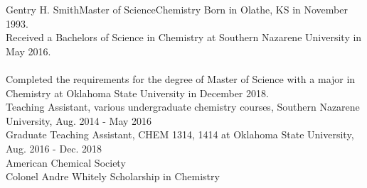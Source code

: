 \newpage
\begin{vita}{Gentry H. Smith}{Master of Science}{Chemistry} %
     Born in Olathe, KS in November 1993. 
     \\ Received a Bachelors of Science in Chemistry at Southern Nazarene University in May 2016. \\ \\
Completed the requirements for the degree of Master of Science with a major in Chemistry at Oklahoma State University in December 2018.
     \\ Teaching Assistant, various undergraduate chemistry courses, Southern Nazarene University, Aug. 2014 - May 2016 \\ Graduate Teaching Assistant, CHEM 1314, 1414 at Oklahoma State University, Aug. 2016 - Dec. 2018
     \\ American Chemical Society
    \\ Colonel Andre Whitely Scholarship in Chemistry
\end{vita}

